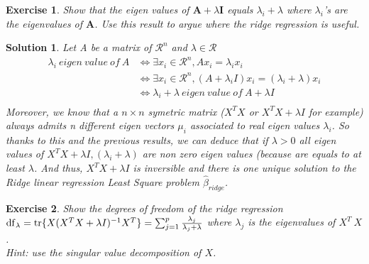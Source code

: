 \documentclass[12pt,a4paper]{article}
\def\R{\mathcal{R}}%
\newtheorem{exercise}{Exercise}
\newtheorem{solution}{Solution}
\begin{document}
\begin{exercise}
Show that the eigen values of $\mathbf A+\lambda \mathbf I$ equals $\lambda_i+\lambda$ where $\lambda_i$'s are the eigenvalues of $\mathbf A$. Use this result to argue where the ridge regression is useful.
\end{exercise}
\begin{solution}
Let A be a matrix of $\R^n$ and $\lambda \in \R$\\
\begin{equation}
\begin{split}
\lambda_i \ eigen\ value\ of\ A & \Longleftrightarrow \exists x_i \in \R^n, Ax_i = \lambda_i x_i \\
 & \Longleftrightarrow \exists x_i \in \R^n, (A + \lambda_i I) x_i = (\lambda_i + \lambda) x_i\\
 &  \Longleftrightarrow \lambda_i + \lambda\ eigen\ value\ of\ A + \lambda I \\
\end{split}
\end{equation} 
Moreover, we know that a $n \times n$ symetric matrix ($X^T X$ or $X^T X + \lambda I$ for example) always admits n different eigen vectors $\mu_i$ associated to real eigen values $\lambda_i$. So thanks to this and the previous results, we can deduce that if $\lambda > 0$ all eigen values of  $X^T X + \lambda I, (\lambda_i + \lambda)$ are non zero eigen values (because are equals to at least $\lambda$. And thus, $X^T X + \lambda I$ is inversible and there is one unique solution to the Ridge linear regression Least Square problem $\hat \beta_{ridge}$.
\end{solution}

\begin{exercise}
Show the degrees of freedom of the ridge regression $\mathrm{df}_\lambda=\mathrm {tr} \{X (X^T X + \lambda I)^{-1} X^T \}=\sum_{j=1}^p {\lambda_j\over \lambda_j+ \lambda}$ where $\lambda_j$ is the eigenvalues of $X^T\ X$. \\
Hint: use the singular value decomposition of $X$.
\end{exercise}
\end{document}
